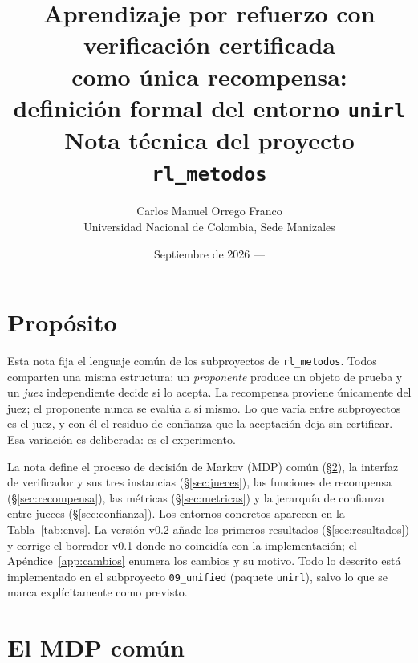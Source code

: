 \documentclass[11pt,a4paper]{article}
\title{Aprendizaje por refuerzo con verificación certificada\\como única recompensa:\\definición formal del entorno \texttt{unirl}\\[0.4em]\large Nota técnica del proyecto \texttt{rl\_metodos}}
\author{Carlos Manuel Orrego Franco\\Universidad Nacional de Colombia, Sede Manizales}
\date{Septiembre de 2026 --- \VersionNota}
\theoremstyle{definition}
\theoremstyle{remark}
\begin{document}
\maketitle

\AvisoPreliminar

\section{Propósito}

Esta nota fija el lenguaje común de los subproyectos de \texttt{rl\_metodos}. Todos comparten una misma estructura: un \emph{proponente} produce un objeto de prueba y un \emph{juez} independiente decide si lo acepta. La recompensa proviene únicamente del juez; el proponente nunca se evalúa a sí mismo. Lo que varía entre subproyectos es el juez, y con él el residuo de confianza que la aceptación deja sin certificar. Esa variación es deliberada: es el experimento.

La nota define el proceso de decisión de Markov (MDP) común (§\ref{sec:mdp}), la interfaz de verificador y sus tres instancias (§\ref{sec:jueces}), las funciones de recompensa (§\ref{sec:recompensa}), las métricas (§\ref{sec:metricas}) y la jerarquía de confianza entre jueces (§\ref{sec:confianza}). Los entornos concretos aparecen en la Tabla~\ref{tab:envs}. La versión v0.2 añade los primeros resultados (§\ref{sec:resultados}) y corrige el borrador v0.1 donde no coincidía con la implementación; el Apéndice~\ref{app:cambios} enumera los cambios y su motivo. Todo lo descrito está implementado en el subproyecto \texttt{09\_unified} (paquete \texttt{unirl}), salvo lo que se marca explícitamente como previsto.

\section{El MDP común}\label{sec:mdp}
\end{document}
